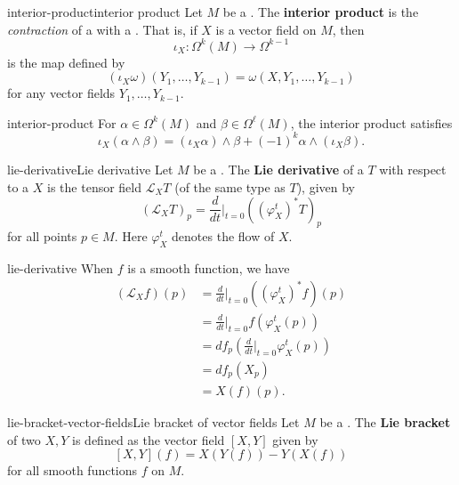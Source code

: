 \begin{topic}{interior-product}{interior product}
    Let $M$ be a . The \textbf{interior product} is the \textit{contraction} of a  with a . That is, if $X$ is a vector field on $M$, then
    \[ \iota_X \colon \Omega^k(M) \to \Omega^{k - 1} \]
    is the map defined by
    \[ (\iota_X \omega)(Y_1, \ldots, Y_{k - 1}) = \omega(X, Y_1, \ldots, Y_{k - 1}) \]
    for any vector fields $Y_1, \ldots, Y_{k - 1}$.
\end{topic}

\begin{example}{interior-product}
    For $\alpha \in \Omega^k(M)$ and $\beta \in \Omega^\ell(M)$, the interior product satisfies
    \[ \iota_X (\alpha \wedge \beta) = (\iota_X \alpha) \wedge \beta + (-1)^k \alpha \wedge (\iota_X \beta) . \]
\end{example}

\begin{topic}{lie-derivative}{Lie derivative}
    Let $M$ be a . The \textbf{Lie derivative} of a  $T$ with respect to a  $X$ is the tensor field $\mathcal{L}_X T$ (of the same type as $T$), given by
    \[ (\mathcal{L}_X T)_p = \frac{d}{dt}\Big|_{t = 0} \left( \left(\varphi^t_X\right)^* T \right)_p \]
    for all points $p \in M$. Here $\varphi^t_X$ denotes the flow of $X$.
\end{topic}

\begin{example}{lie-derivative}
    When $f$ is a smooth function, we have
    \[ \begin{aligned}
        (\mathcal{L}_X f)(p)
            &= \frac{d}{dt}\Big|_{t = 0} \left(\left(\varphi^t_X\right)^* f \right)(p) \\
            &= \frac{d}{dt}\Big|_{t = 0} f \left(\varphi^t_X(p)\right) \\
            &= df_p \left( \frac{d}{dt}\Big|_{t = 0} \varphi^t_X(p) \right) \\
            &= df_p(X_p) \\
            &= X(f)(p) .
    \end{aligned} \]
    
\end{example}

\begin{topic}{lie-bracket-vector-fields}{Lie bracket of vector fields}
    Let $M$ be a . The \textbf{Lie bracket} of two  $X, Y$ is defined as the vector field $[X, Y]$ given by
    \[ [X, Y](f) = X(Y(f)) - Y(X(f)) \]
    for all smooth functions $f$ on $M$.
\end{topic}

